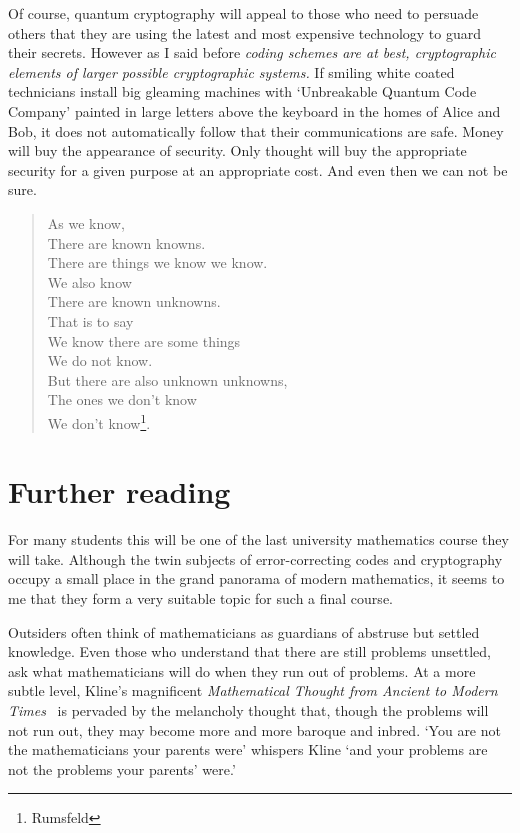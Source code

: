 \documentclass[12pt,a4paper]{article}
\theoremstyle{plain}
\theoremstyle{definition}
\begin{document}
Of course, quantum cryptography will appeal to
those who need to persuade others that they are using
the latest and most expensive technology to
guard their secrets. However as I said before
\emph{coding schemes
are at best, cryptographic elements
of larger possible cryptographic systems.}
If smiling white coated technicians install big 
gleaming machines with `Unbreakable
Quantum Code Company' painted in large letters
above the keyboard in the homes of Alice and Bob,
it does not automatically follow that their
communications are safe. Money will buy
the appearance of security. Only thought will buy
the appropriate security for a given purpose
at an appropriate cost. And even then we can not
be sure.

\begin{verse}
As we know,\\
There are known knowns.\\
There are things we know we know.\\
We also know\\
There are known unknowns.\\
That is to say\\
We know there are some things\\
We do not know.\\
But there are also unknown unknowns,\\
The ones we don't know\\
We don't know\footnote{Rumsfeld}.
\end{verse}

\section{Further reading} For many students
this will be one of the last university mathematics
course they will take. Although the twin
subjects of error-correcting codes and
cryptography occupy a small place in the
grand panorama of modern mathematics,
it seems to me that they form a very suitable
topic for such a final course.

Outsiders often think of mathematicians as
guardians of abstruse but settled knowledge.
Even those who understand that there are
still problems unsettled, ask what
mathematicians will do when they run out
of problems. At a more subtle
level, Kline's magnificent
\emph{Mathematical Thought from Ancient to
Modern Times}~\cite{Kline} is pervaded by
the melancholy thought
that, though the problems
will not run out, they may become more
and more baroque and inbred. `You are not the mathematicians
your
parents were' whispers Kline
`and your problems are not the
problems your parents' were.'
\end{document}
